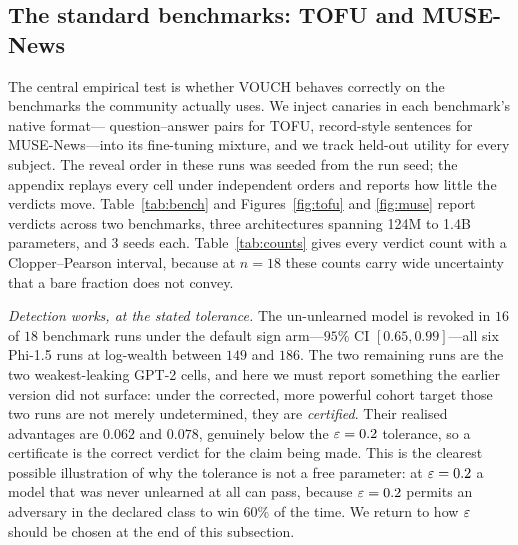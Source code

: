 \begin{table}[t]
\centering\small
\caption{GPT-2 end-to-end over $2$ seeds ($640$ pairs, two-sided $\eps=0.2$, cohort
target): per-seed verdicts (\vI\ issued, \vR\ revoked, \vU\ undetermined), the mean
confidence-sequence upper bound on $\Delta$, and the mean canary score gap $\bar D$
with its across-seed standard deviation. Seeds $1$ and $2$ are shown; the seed-$0$
run of this tier predates per-pair logging and cannot be replayed under the cohort
target, so it is omitted rather than mixed in from the earlier analysis.}
\label{tab:gpt2v2}

\end{table}

\subsection{The standard benchmarks: TOFU and MUSE-News}\label{sec:exp-bench}

The central empirical test is whether VOUCH behaves correctly on the benchmarks the
community actually uses. We inject canaries in each benchmark's native format---
question--answer pairs for TOFU, record-style sentences for MUSE-News---into its
fine-tuning mixture, and we track held-out utility for every subject. The reveal order
in these runs was seeded from the run seed; the appendix replays every cell under
independent orders and reports how little the verdicts move.
Table~\ref{tab:bench} and Figures~\ref{fig:tofu} and \ref{fig:muse} report verdicts
across two benchmarks, three architectures spanning 124M to 1.4B parameters, and
$3$ seeds each. Table~\ref{tab:counts} gives every verdict count with a
Clopper--Pearson interval, because at $n = 18$ these counts carry wide uncertainty that a bare
fraction does not convey.

\emph{Detection works, at the stated tolerance.} The un-unlearned model is revoked in
$16$ of $18$ benchmark runs under the default sign arm---$95\%$ CI $[0.65, 0.99]$---all
six Phi-1.5 runs at log-wealth between $149$ and $186$. The two
remaining runs are the two weakest-leaking GPT-2 cells, and here we must report
something the earlier version did not surface: under the corrected, more powerful
cohort target those two runs are not merely undetermined, they are \emph{certified}.
Their realised advantages are $0.062$ and $0.078$, genuinely below the
$\eps = 0.2$ tolerance, so a certificate is the correct verdict for the claim being
made. This is the clearest possible illustration of why the tolerance is not a free
parameter: at $\eps = 0.2$ a model that was never unlearned at all can pass, because
$\eps = 0.2$ permits an adversary in the declared class to win $60\%$ of the time.
We return to how $\varepsilon$ should be chosen at the end of this subsection.

